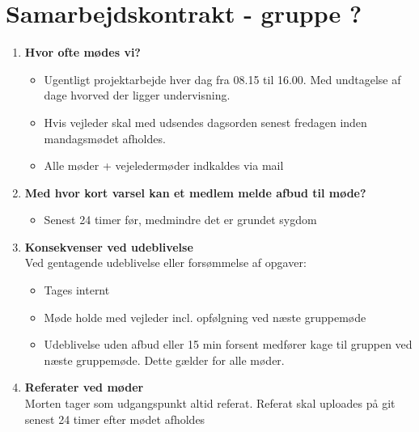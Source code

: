 

	\chapter*{Samarbejdskontrakt - gruppe ?}
	\begin{enumerate}
		\item \textbf{Hvor ofte mødes vi?}
			\begin{itemize}[-]
				\itemsep 0.3em
				\item Ugentligt projektarbejde hver dag fra 08.15 til 16.00. Med undtagelse af dage hvorved der ligger undervisning.
				\item Hvis vejleder skal med udsendes dagsorden senest fredagen inden mandagsmødet afholdes.
				\item Alle møder + vejeledermøder indkaldes via mail
				\vspace{1cm}				
			\end{itemize}
		\item \textbf{Med hvor kort varsel kan et medlem melde afbud til møde?}
			\begin{itemize}[-]
				\itemsep 0.3em
				\item Senest 24 timer før, medmindre det er grundet sygdom
				\vspace{1cm}
			\end{itemize}
			
		\item \textbf{Konsekvenser ved udeblivelse}\\
			Ved gentagende udeblivelse eller forsømmelse af opgaver:
			\begin{itemize}[-]
				\itemsep 0.3em
				\item Tages internt
				\item Møde holde med vejleder incl. opfølgning ved næste gruppemøde
				\item Udeblivelse uden afbud eller 15 min forsent medfører kage til gruppen ved næste gruppemøde. Dette gælder for alle møder.
				\vspace{1cm}
			\end{itemize}
		\item \textbf{Referater ved møder} \\
				Morten tager som udgangspunkt altid referat.
				Referat skal uploades på git senest 24 timer efter mødet afholdes
				\vspace{1cm}
			

\end{enumerate}

